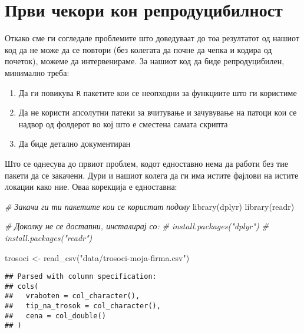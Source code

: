 \documentclass[
]{book}
\newenvironment{Shaded}{\begin{snugshade}}{\end{snugshade}}
\newcommand{\CommentTok}[1]{\textcolor[rgb]{0.56,0.35,0.01}{\textit{#1}}}
\newcommand{\FunctionTok}[1]{\textcolor[rgb]{0.00,0.00,0.00}{#1}}
\newcommand{\NormalTok}[1]{#1}
\newcommand{\OtherTok}[1]{\textcolor[rgb]{0.56,0.35,0.01}{#1}}
\newcommand{\StringTok}[1]{\textcolor[rgb]{0.31,0.60,0.02}{#1}}
\begin{document}
\hypertarget{ux43fux440ux432ux438-ux447ux435ux43aux43eux440ux438-ux43aux43eux43d-ux440ux435ux43fux440ux43eux434ux443ux446ux438ux431ux438ux43bux43dux43eux441ux442}{%
\section{Први чекори кон репродуцибилност}\label{ux43fux440ux432ux438-ux447ux435ux43aux43eux440ux438-ux43aux43eux43d-ux440ux435ux43fux440ux43eux434ux443ux446ux438ux431ux438ux43bux43dux43eux441ux442}}

Откако сме ги согледале проблемите што доведуваат до тоа резултатот од нашиот код да не може да се повтори (без колегата да почне да чепка и кодира од почеток), можеме да интервенираме. За нашиот код да биде репродуцибилен, минимално треба:

\begin{enumerate}
\def\labelenumi{\arabic{enumi}.}
\item
  Да ги повикува \texttt{R} пакетите кои се неопходни за функциите што ги користиме
\item
  Да не користи апсолутни патеки за вчитување и зачувување на патоци кои се надвор од фолдерот во кој што е сместена самата скрипта
\item
  Да биде детално документиран
\end{enumerate}

Што се однесува до првиот проблем, кодот едноставно нема да работи без тие пакети да се закачени. Дури и нашиот колега да ги има истите фајлови на истите локации како ние. Оваа корекција е едноставна:

\begin{Shaded}
\begin{Highlighting}[]
\CommentTok{\# Закачи ги ти пакетите кои се користат подолу }
\FunctionTok{library}\NormalTok{(dplyr)}
\FunctionTok{library}\NormalTok{(readr)}

\CommentTok{\# Доколку не се достапни, инсталирај со:}
\CommentTok{\# install.packages("dplyr")}
\CommentTok{\# install.packages("readr")}

\NormalTok{trosoci }\OtherTok{\textless{}{-}} \FunctionTok{read\_csv}\NormalTok{(}\StringTok{"data/trosoci{-}moja{-}firma.csv"}\NormalTok{)}
\end{Highlighting}
\end{Shaded}

\begin{verbatim}
## Parsed with column specification:
## cols(
##   vraboten = col_character(),
##   tip_na_trosok = col_character(),
##   cena = col_double()
## )
\end{verbatim}
\end{document}
